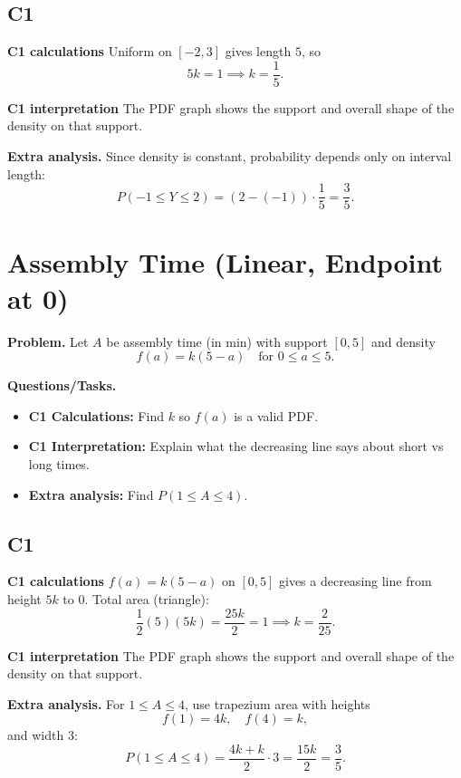 	\subsection*{C1}

\textbf{C1 calculations}
Uniform on $[-2,3]$ gives length $5$, so
	\[
	5k=1\implies k=\frac15.
	\]

\textbf{C1 interpretation}
The PDF graph shows the support and overall shape of the density on that support.

\textbf{Extra analysis.}
Since density is constant, probability depends only on interval length:
\[
P(-1\le Y\le2)=(2-(-1))\cdot\frac15=\frac35.
\]

	\section{Assembly Time (Linear, Endpoint at 0)}
	
	\textbf{Problem.}
	Let $A$ be assembly time (in min) with support $[0,5]$ and density
	\[
	f(a)=k(5-a)\quad\text{for }0\le a\le 5.
	\]
	
	\textbf{Questions/Tasks.}
	\begin{itemize}
		\item \textbf{C1 Calculations:} Find $k$ so $f(a)$ is a valid PDF.
		\item \textbf{C1 Interpretation:} Explain what the decreasing line says about short vs long times.
		\item \textbf{Extra analysis:} Find $P(1\le A\le 4)$.
	\end{itemize}

	\subsection*{C1}

\textbf{C1 calculations}
$f(a)=k(5-a)$ on $[0,5]$ gives a decreasing line from height $5k$ to $0$.
	Total area (triangle):
	\[
	\frac12(5)(5k)=\frac{25k}{2}=1\implies k=\frac{2}{25}.
	\]

\textbf{C1 interpretation}
The PDF graph shows the support and overall shape of the density on that support.

\textbf{Extra analysis.}
For $1\le A\le4$, use trapezium area with heights
\[
f(1)=4k,\quad f(4)=k,
\]
and width $3$:
\[
P(1\le A\le4)=\frac{4k+k}{2}\cdot3=\frac{15k}{2}=\frac35.
\]

